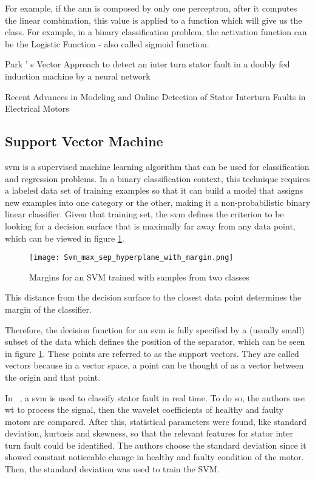 For example, if the \Acrshort{ann} is composed by only one perceptron, after it computes the linear combination, this value is applied to a function which will give us the class. For example, in a binary classification problem, the activation function can be the Logistic Function - also called sigmoid function.



Park ’ s Vector Approach to detect an inter turn stator fault in a doubly fed induction machine by a neural network


Recent Advances in Modeling and Online Detection of Stator Interturn Faults in Electrical Motors


\subsection{Support Vector Machine} %
\label{sec:svm}

\Acrfull{svm} is a supervised machine learning algorithm that can be used for classification and regression problems. In a binary classification context, this technique requires a labeled data set of training examples so that it can build a model that assigns new examples into one category or the other, making it a non-probabilistic binary linear classifier.
Given that training set, the \Acrshort{svm} defines the criterion to be looking for a decision surface that is maximally far away from any data point, which can be viewed in figure \ref{fig:svm_margin}. 

\begin{figure}[htpb]
\centering
\texttt{[image: Svm\_max\_sep\_hyperplane\_with\_margin.png]}
\caption{Margins for an SVM trained with samples from two classes}
\label{fig:svm_margin}
\end{figure}

This distance from the decision surface to the closest data point determines the margin of the classifier.

Therefore, the decision function for an \Acrshort{svm} is fully specified by a (usually small) subset of the data which defines the position of the separator, which can be seen in figure \ref{fig:svm_margin}. These points are referred to as the support vectors. They are called vectors because in a vector space, a point can be thought of as a vector between the origin and that point.


In ~\cite{Jagadanand2015}, a \Acrshort{svm} is used to classify stator fault in real time. To do so, the authors use \acrfull{wt} to process the signal, then the wavelet coefficients of healthy and faulty motors are compared. After this, statistical parameters were found, like standard deviation, kurtosis and skewness, so that the relevant features for stator inter turn fault could be identified. The authors choose the standard deviation since it showed constant noticeable change in healthy and faulty condition of the motor. Then, the standard deviation was used to train the SVM.

